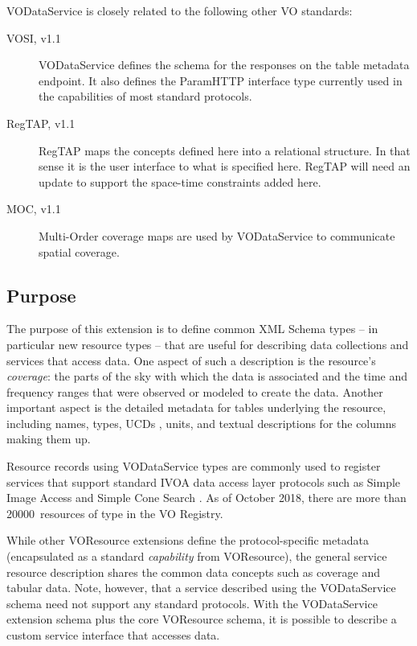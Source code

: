 \documentclass[11pt,a4paper]{ivoa}
\begin{document}
VODataService is closely related to the following other VO standards:

\begin{description}
\item[VOSI, v1.1 \citep{2017ivoa.spec.0524G}] VODataService defines the
schema for the responses on the table metadata endpoint.  It also
defines the ParamHTTP interface type currently used in the capabilities of most
standard protocols.
\item[RegTAP, v1.1 \citep{2019ivoa.spec.1011D}] RegTAP maps the concepts
defined here into a relational structure.  In that sense it is the
user interface to what is specified here.  RegTAP will need an update
to support the space-time constraints added here.
\item[MOC, v1.1 \citep{2019ivoa.spec.1007F}] Multi-Order coverage maps
are used by VODataService to communicate spatial coverage.
\end{description}

\subsection{Purpose}


The purpose of this extension is to define common XML Schema
types -- in particular new resource types -- that are useful for describing
data collections and services that access data.  One aspect of such a
description is the resource's \emph{coverage}:  the parts of the
sky with which the data is associated and the time and frequency ranges that
were observed or modeled to create the data.  Another important aspect
is the detailed metadata for tables underlying the resource, including
names, types, UCDs
\citep{2005ivoa.spec.1231D}, units,
and textual descriptions for the columns making them up.

Resource records using VODataService types are commonly used to register
services that support standard IVOA data access layer protocols such
as Simple Image Access \citep{2015ivoa.spec.1223D} and Simple Cone Search
\citep{2008ivoa.specQ0222P}.  As of October 2018, there are more than
20000~resources of type  in the VO Registry.

While other VOResource extensions
define the protocol-specific metadata (encapsulated as a standard
\emph{capability} from VOResource), the general service
resource description shares the common data concepts such as
coverage and tabular data.  Note, however, that a service described
using the VODataService schema need not support any standard
protocols.  With the VODataService extension schema plus the core
VOResource schema, it is possible to describe a custom service
interface that accesses data.
\end{document}
